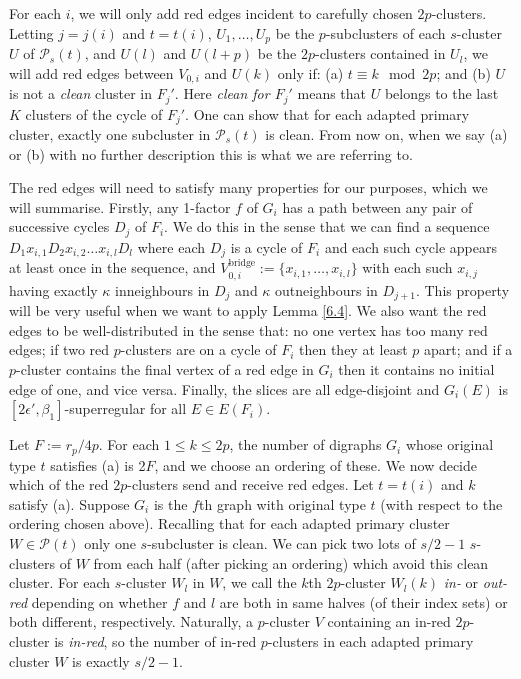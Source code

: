 \documentclass[10pt,letterpaper, reqno]{amsart}
\theoremstyle{definition}
\numberwithin{equation}{section}
\begin{document}
For each $i$, we will only add red edges incident to carefully chosen $2p$-clusters. Letting $j=j(i)$ and $t=t(i)$, $U_1,\dots,U_p$ be the $p$-subclusters of each $s$-cluster $U$ of $\mathcal{P}_s(t)$, and $U(l)$ and $U(l+p)$ be the $2p$-clusters contained in $U_l$, we will add red edges between $V_{0,i}$ and $U(k)$ only if: (a) $t \equiv k \mod 2p$; and (b) $U$ is not a \textit{clean} cluster in $F_j'$. Here \textit{clean for $F_j'$} means that $U$ belongs to the last $K$ clusters of the cycle of $F_j'$. One can show that for each adapted primary cluster, exactly one subcluster in $\mathcal{P}_s(t)$ is clean. From now on, when we say (a) or (b) with no further description this is what we are referring to.

The red edges will need to satisfy many properties for our purposes, which we will summarise. Firstly, any 1-factor $f$ of $G_i$ has a path between any pair of successive cycles $D_j$ of $F_i$. We do this in the sense that we can find a sequence $D_1x_{i,1}D_2x_{i,2}\dots x_{i,l}D_l$ where each $D_j$ is a cycle of $F_i$ and each such cycle appears at least once in the sequence, and $V_{0,i}^\text{bridge}:=\{x_{i,1}, \dots, x_{i,l}\}$ with each such $x_{i,j}$ having exactly $\kappa$ inneighbours in $D_j$ and $\kappa$ outneighbours in $D_{j+1}$. This property will be very useful when we want to apply Lemma \ref{6.4}. We also want the red edges to be well-distributed in the sense that: no one vertex has too many red edges; if two red $p$-clusters are on a cycle of $F_i$ then they at least $p$ apart; and if a $p$-cluster contains the final vertex of a red edge in $G_i$ then it contains no initial edge of one, and vice versa. Finally, the slices are all edge-disjoint and $G_i(E)$ is $[2\epsilon', \beta_1]$-superregular for all $E \in E(F_i)$. 

Let $F:= r_p/4p$. For each $1\leq k \leq 2p$, the number of digraphs $G_i$ whose original type $t$ satisfies (a) is 2$F$, and we choose an ordering of these. We now decide which of the red $2p$-clusters send and receive red edges. Let $t=t(i)$ and $k$ satisfy (a). Suppose $G_i$ is the $f$th graph with original type $t$ (with respect to the ordering chosen above). Recalling that for each adapted primary cluster $W \in \mathcal{P}(t)$ only one $s$-subcluster is clean. We can pick two lots of $s/2-1$ $s$-clusters of $W$ from each half (after picking an ordering) which avoid this clean cluster. For each $s$-cluster $W_l$ in $W$, we call the $k$th $2p$-cluster $W_l(k)$ \textit{in-} or \textit{out-red} depending on whether $f$ and $l$ are both in same halves (of their index sets) or both different, respectively. Naturally, a $p$-cluster $V$ containing an in-red $2p$-cluster is \textit{in-red}, so the number of in-red $p$-clusters in each adapted primary cluster $W$ is exactly $s/2-1$. 
\end{document}
